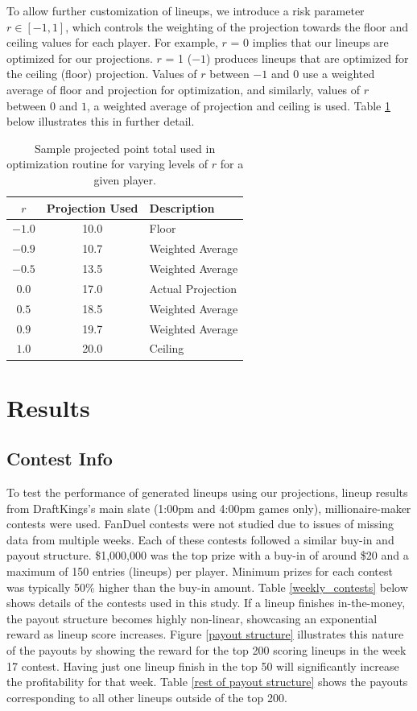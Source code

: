 \documentclass[12pt]{article}
\begin{document}
To allow further customization of lineups, we introduce a risk parameter $r \in [-1, 1]$, which controls the weighting of the projection towards the floor and ceiling values for each player. For example, $r$ = 0 implies that our lineups are optimized for our projections. $r$ = 1 ($-1$) produces lineups that are optimized for the ceiling (floor) projection. Values of $r$ between $-1$ and 0 use a weighted average of floor and projection for optimization, and similarly, values of $r$ between 0 and $1$, a weighted average of projection and ceiling is used. Table \ref{risk_param} below illustrates this in further detail.

\begin{table}[H]
\caption{Sample projected point total used in optimization routine for varying levels of $r$ for a given player.}
\centering
\begin{tabular}{ccl}
\toprule 
$r$ & Projection Used & Description \\
\midrule 
$-1.0$ & 10.0 & Floor \\
$-0.9$ & 10.7 & Weighted Average \\
$-0.5$ & 13.5 & Weighted Average \\
$0.0$ & 17.0 & Actual Projection \\
$0.5$ & 18.5 & Weighted Average \\
$0.9$ & 19.7 & Weighted Average \\
$1.0$ & 20.0 & Ceiling \\
\bottomrule
\end{tabular}
\label{risk_param}
\end{table}

\pagebreak
\section{Results}
\subsection{Contest Info}
To test the performance of generated lineups using our projections, lineup results from DraftKings's main slate (1:00pm and 4:00pm games only), millionaire-maker contests were used. FanDuel contests were not studied due to issues of missing data from multiple weeks. Each of these contests followed a similar buy-in and payout structure. \$1,000,000 was the top prize with a buy-in of around \$20 and a maximum of 150 entries (lineups) per player. Minimum prizes for each contest was typically 50\% higher than the buy-in amount. Table \ref{weekly_contests} below shows details of the contests used in this study. If a lineup finishes in-the-money, the payout structure becomes highly non-linear, showcasing an exponential reward as lineup score increases. Figure \ref{payout structure} illustrates this nature of the payouts by showing the reward for the top 200 scoring lineups in the week 17 contest. Having just one lineup finish in the top 50 will significantly increase the profitability for that week. Table \ref{rest of payout structure} shows the payouts corresponding to all other lineups outside of the top 200. 
\end{document}
